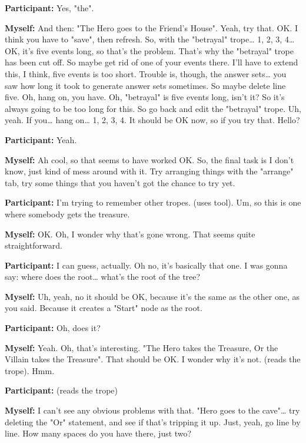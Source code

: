 \documentclass[11pt]{report}
\newcommand{\llabel}[1]{\hypertarget{llineno:#1}{\linelabel{#1}}}
\begin{document}
\begin{linenumbers}
\textbf{Participant:} Yes, "the".

\textbf{Myself:} And then: "The Hero goes to the Friend's House". Yeah, try
that. OK. I think you have to "save", then refresh. So, with the "betrayal"
trope\ldots{} 1, 2, 3, 4\ldots{} OK, it's five events long, so that's the
problem. That's why the "betrayal" trope has been cut off. So maybe get rid of
one of your events there. I'll have to extend this, I think, five events is too
short. Trouble is, though, the answer sets\ldots{} you saw how long it took to
generate answer sets sometimes. So maybe delete line five. Oh, hang on, you
have. Oh, "betrayal" is five events long, isn't it? So it's always going to be
too long for this. So go back and edit the "betrayal" trope. Uh, yeah. If
you\ldots{} hang on\ldots{} 1, 2, 3, 4. It should be OK now, so if you try that.
Hello?\llabel{lne:bug1h}

\textbf{Participant:} Yeah.

\textbf{Myself:} Ah cool, so that seems to have worked OK. So, the final task is I don't know, just kind of mess around with it. Try arranging things with the "arrange" tab, try some things that you haven't got the chance to try yet.

\textbf{Participant:} I'm trying to remember other tropes. (uses tool). Um, so this is one where somebody gets the treasure.

\textbf{Myself:} OK. Oh, I wonder why that's gone wrong. That seems quite straightforward.

\textbf{Participant:} I can guess, actually. Oh no, it's basically that one. I was gonna say: where does the root\ldots{} what's the root of the tree?

\textbf{Myself:} Uh, yeah, no it should be OK, because it's the same as the other one, as you said. Because it creates a "Start" node as the root.

\textbf{Participant:} Oh, does it?

\textbf{Myself:} Yeah. Oh, that's interesting. "The Hero takes the Treasure, Or the Villain takes the Treasure". That should be OK. I wonder why it's not. (reads the trope). Hmm.

\textbf{Participant:} (reads the trope)

\textbf{Myself:} I can't see any obvious problems with that. "Hero goes to the cave"\ldots{} try deleting the "Or" statement, and see if that's tripping it up. Just, yeah, go line by line. How many spaces do you have there, just two?


\end{linenumbers}
\end{document}
